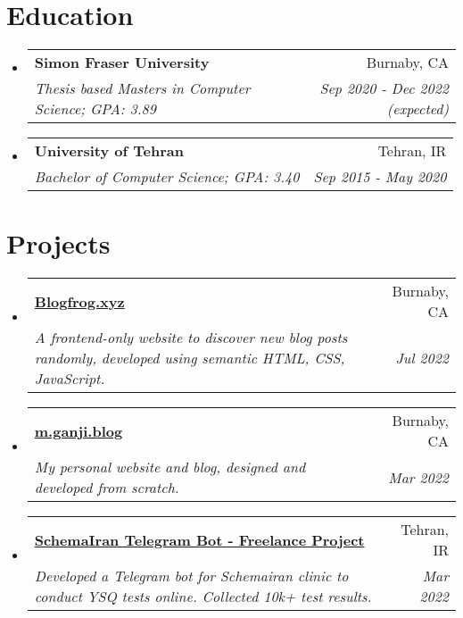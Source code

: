 \documentclass[letterpaper,10.8pt]{article}
\makeatletter
\newcommand{\resumeSubheading}[4]{
  \vspace{-1pt}\item
    \begin{tabular*}{0.97\textwidth}{l@{\extracolsep{\fill}}r}
      \textbf{#1} & #2 \\
      \textit{\small#3} & \textit{\small #4} \\
    \end{tabular*}\vspace{-5pt}
}
\newcommand{\resumeSubHeadingListStart}{\begin{itemize}[leftmargin=*]}
\newcommand{\resumeSubHeadingListEnd}{\end{itemize}}
\makeatother
\begin{document}
\section{Education}
  \resumeSubHeadingListStart
    \resumeSubheading
      {Simon Fraser University}{Burnaby, CA}
      {Thesis based Masters in Computer Science;  GPA: 3.89}{Sep 2020 - Dec 2022 (expected)}
      
	    
    \resumeSubheading
      {University of Tehran}{Tehran, IR}
      {Bachelor of Computer Science;  GPA: 3.40}{Sep 2015 - May 2020}
  \resumeSubHeadingListEnd

\section{Projects}

\resumeSubHeadingListStart
    \resumeSubheading
      {\href{http://blogfrog.xyz}{Blogfrog.xyz}}{Burnaby, CA}
      {A frontend-only website to discover new blog posts randomly, developed using semantic HTML, CSS, JavaScript.}{Jul 2022}
	    
    \resumeSubheading
      {\href{http://m.ganji.blog}{m.ganji.blog}}{Burnaby, CA}
      {My personal website and blog, designed and developed from scratch.}{Mar 2022}
      
    \resumeSubheading
      {\href{https://t.me/SchemaIran_Bot}{SchemaIran Telegram Bot - Freelance Project}}{Tehran, IR}
      {Developed a Telegram bot for Schemairan clinic to conduct YSQ tests online. Collected 10k+ test results.}{Mar 2022}
\resumeSubHeadingListEnd
\end{document}
